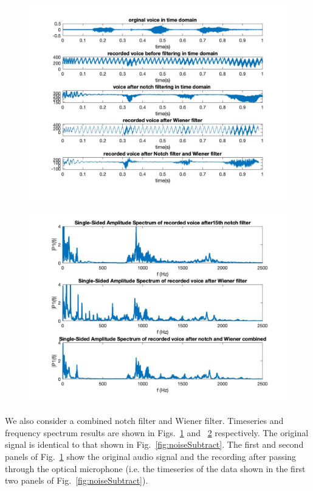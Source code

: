 \documentclass[paper-main.tex]{subfiles}
\begin{document}
\begin{figure}
\begin{center}
\includegraphics[width=\textwidth]{figures/timeSeriesNotchWiener.jpg}
\end{center}
\caption{\label{fig:timeNotchWiener}
}
\end{figure}


\begin{figure}
\begin{center}
\includegraphics[width=\textwidth]{figures/freqNotchWiener.jpg}
\end{center}
\caption{\label{fig:freqNotchWiener}
}
\end{figure}

We also consider a combined notch filter and Wiener filter.
Timeseries and frequency spectrum results are shown in Figs.~\ref{fig:timeNotchWiener} and ~\ref{fig:freqNotchWiener} respectively. 
The original signal is identical to that shown in Fig.~\ref{fig:noiseSubtract}.
The first and second panels of Fig.~\ref{fig:timeNotchWiener} show the original audio signal and the recording after passing through the optical microphone (i.e. the timeseries of the data shown in the first two panels of Fig.~\ref{fig:noiseSubtract}). 
\end{document}
